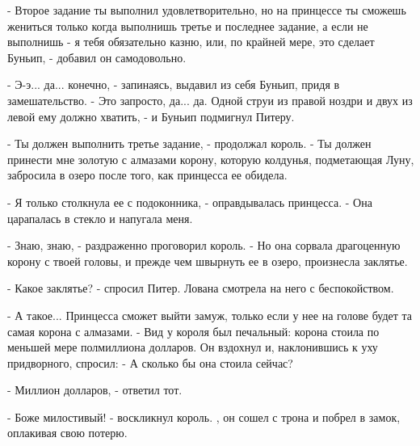 \par- Второе задание ты выполнил удовлетворительно, но на принцессе ты 
сможешь жениться только когда выполнишь третье и последнее задание, а 
если не выполнишь - я тебя обязательно казню, или, по крайней мере, 
это сделает Буньип, - добавил он самодовольно.
\par- Э-э... да... конечно, - запинаясь, выдавил из себя Буньип, придя 
в замешательство. - Это запросто, да... да. Одной струи из правой 
ноздри и двух из левой ему должно хватить, - и Буньип подмигнул 
Питеру.
\par- Ты должен выполнить третье задание, - продолжал король. - Ты 
должен принести мне золотую с алмазами корону, которую колдунья, 
подметающая Луну, забросила в озеро после того, как принцесса ее 
обидела.
\par- Я только столкнула ее с подоконника, - оправдывалась принцесса. 
- Она царапалась в стекло и напугала меня.
\par- Знаю, знаю, - раздраженно проговорил король. - Но она сорвала 
драгоценную корону с твоей головы, и прежде чем швырнуть ее в озеро, 
произнесла заклятье.
\par- Какое заклятье? - спросил Питер. Лована смотрела на него с 
беспокойством.
\par- А такое... Принцесса сможет выйти замуж, только если у нее на 
голове будет та самая корона с алмазами. - Вид у короля был печальный: 
корона стоила по меньшей мере полмиллиона долларов. Он вздохнул и, 
наклонившись к уху придворного, спросил: - А сколько бы она стоила 
сейчас?
\par- Миллион долларов, - ответил тот.
\par- Боже милостивый! - воскликнул король.
, он сошел с трона и побрел в замок, оплакивая свою потерю.
